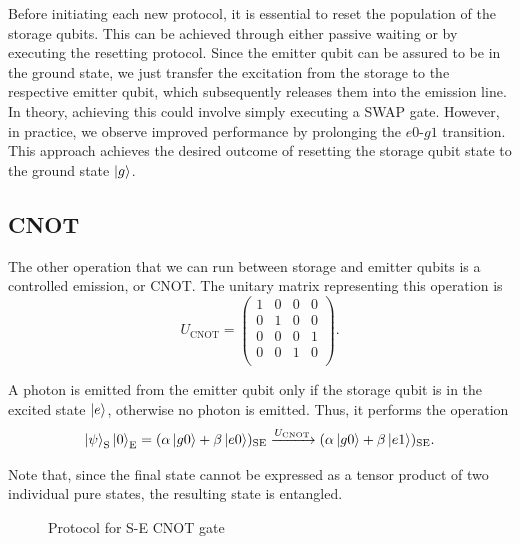 Before initiating each new protocol, it is essential to reset the population of the storage qubits.
This can be achieved through either passive waiting or by executing the resetting protocol.
Since the emitter qubit can be assured to be in the ground state, we just transfer the excitation from the storage to the respective emitter qubit, which subsequently releases them into the emission line.
In theory, achieving this could involve simply executing a SWAP gate.
However, in practice, we observe improved performance by prolonging the $e0$-$g1$ transition.
This approach achieves the desired outcome of resetting the storage qubit state to the ground state $\ket{g}$.

\subsection{CNOT}

The other operation that we can run between storage and emitter qubits is a controlled emission, or CNOT.
The unitary matrix representing this operation is
\begin{equation}
    U_{\text{CNOT}} = 
    \begin{pmatrix}
    1 & 0 & 0 & 0 \\
    0 & 1 & 0 & 0 \\
    0 & 0 & 0 & 1 \\
    0 & 0 & 1 & 0 \\
\end{pmatrix}.
\end{equation}

A photon is emitted from the emitter qubit only if the storage qubit is in the excited state $\ket{e}$, otherwise no photon is emitted.
Thus, it performs the operation
\begin{equation}
    \ket{\psi}_{\text{S}} \ket{0}_{\text{E}} = 
    (\alpha \ket{g0} + \beta \ket{e0})_{\text{SE}} \xrightarrow{U_{\text{CNOT}}}
    (\alpha \ket{g0} + \beta \ket{e1})_{\text{SE}} .
\end{equation}

Note that, since the final state cannot be expressed as a tensor product of two individual pure states, the resulting state is entangled.

\begin{figure}
    \centering
    
    \vspace{-1cm}
    \caption{Protocol for S-E CNOT gate}
    \label{fig:SE_CNOT}
\end{figure}

